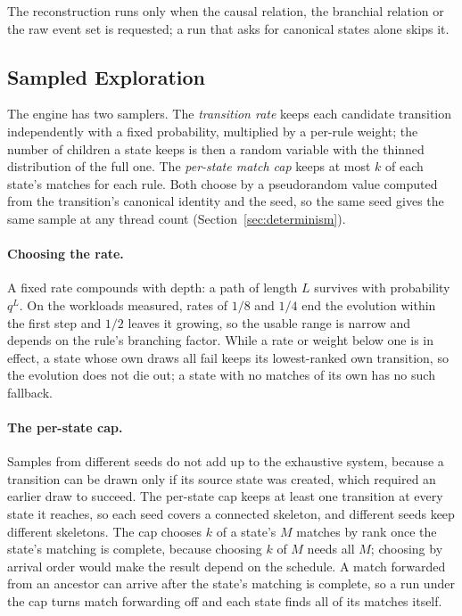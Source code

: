 The reconstruction runs only when the causal relation, the branchial relation or the raw event set
is requested; a run that asks for canonical states alone skips it.

\subsection{Sampled Exploration}
\label{sec:sampling}

The engine has two samplers. The \emph{transition rate} keeps each candidate transition
independently with a fixed probability, multiplied by a per-rule weight; the number of children a
state keeps is then a random variable with the thinned distribution of the full one. The
\emph{per-state match cap} keeps at most $k$ of each state's matches for each rule. Both choose by a
pseudorandom value computed from the transition's canonical identity and the seed, so the same seed
gives the same sample at any thread count (Section~\ref{sec:determinism}).

\paragraph{Choosing the rate.}
A fixed rate compounds with depth: a path of length $L$ survives with probability $q^L$. On the
workloads measured, rates of $1/8$ and $1/4$ end the evolution within the first step and $1/2$
leaves it growing, so the usable range is narrow and depends on the rule's branching factor. While
a rate or weight below one is in effect, a state whose own draws all fail keeps its
lowest-ranked own transition, so the evolution does not die out; a state with no matches of its
own has no such fallback.

\paragraph{The per-state cap.}
Samples from different seeds do not add up to the exhaustive system, because a transition can be
drawn only if its source state was created, which required an earlier draw to succeed. The
per-state cap keeps at least one transition at every state it reaches, so each seed covers a
connected skeleton, and different seeds keep different skeletons. The cap chooses $k$ of a state's
$M$ matches by rank once the state's matching is complete, because choosing $k$ of $M$ needs all
$M$; choosing by arrival order would make the result depend on the schedule. A match forwarded
from an ancestor can arrive after the state's matching is complete, so a run under the cap turns
match forwarding off and each state finds all of its matches itself.

